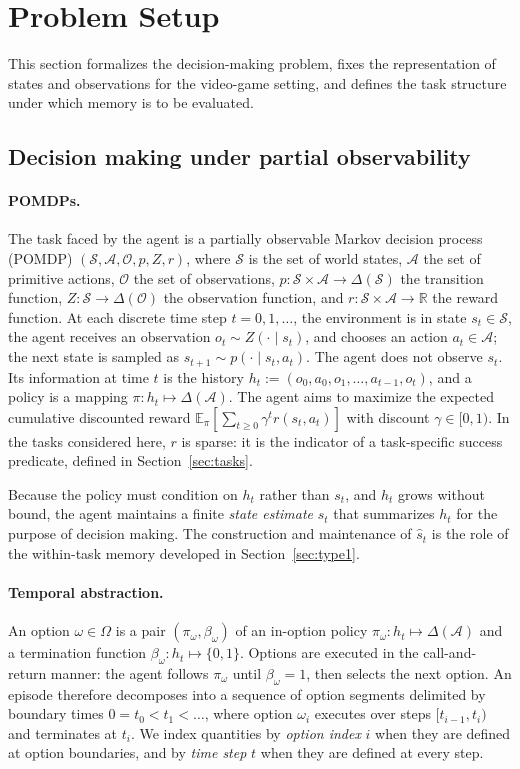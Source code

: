 \documentclass[11pt]{article}
\newcommand{\calS}{\mathcal{S}}
\newcommand{\calA}{\mathcal{A}}
\newcommand{\calO}{\mathcal{O}}
\newcommand{\shat}{\hat{s}}
\begin{document}
\section{Problem Setup}
\label{sec:setup}

This section formalizes the decision-making problem, fixes the representation of states and observations for the video-game setting, and defines the task structure under which memory is to be evaluated.

\subsection{Decision making under partial observability}
\label{sec:pomdp}

\paragraph{POMDPs.}
The task faced by the agent is a partially observable Markov decision process (POMDP) $(\calS, \calA, \calO, p, Z, r)$, where $\calS$ is the set of world states, $\calA$ the set of primitive actions, $\calO$ the set of observations, $p:\calS\times\calA\to\Delta(\calS)$ the transition function, $Z:\calS\to\Delta(\calO)$ the observation function, and $r:\calS\times\calA\to\mathbb{R}$ the reward function. At each discrete time step $t=0,1,\dots$, the environment is in state $s_t\in\calS$, the agent receives an observation $o_t\sim Z(\cdot\mid s_t)$, and chooses an action $a_t\in\calA$; the next state is sampled as $s_{t+1}\sim p(\cdot\mid s_t,a_t)$. The agent does not observe $s_t$. Its information at time $t$ is the history $h_t := (o_0,a_0,o_1,\dots,a_{t-1},o_t)$, and a policy is a mapping $\pi: h_t\mapsto \Delta(\calA)$. The agent aims to maximize the expected cumulative discounted reward $\mathbb{E}_\pi[\sum_{t\ge 0}\gamma^t r(s_t,a_t)]$ with discount $\gamma\in[0,1)$. In the tasks considered here, $r$ is sparse: it is the indicator of a task-specific success predicate, defined in Section~\ref{sec:tasks}.

Because the policy must condition on $h_t$ rather than $s_t$, and $h_t$ grows without bound, the agent maintains a finite \emph{state estimate} $\shat_t$ that summarizes $h_t$ for the purpose of decision making. The construction and maintenance of $\shat_t$ is the role of the within-task memory developed in Section~\ref{sec:type1}.

\paragraph{Temporal abstraction.}
An option $\omega\in\Omega$ is a pair $(\pi_\omega,\beta_\omega)$ of an in-option policy $\pi_\omega:h_t\mapsto\Delta(\calA)$ and a termination function $\beta_\omega:h_t\mapsto\{0,1\}$. Options are executed in the call-and-return manner: the agent follows $\pi_\omega$ until $\beta_\omega=1$, then selects the next option. An episode therefore decomposes into a sequence of option segments delimited by boundary times $0=t_0<t_1<\dots$, where option $\omega_i$ executes over steps $[t_{i-1},t_i)$ and terminates at $t_i$. We index quantities by \emph{option index} $i$ when they are defined at option boundaries, and by \emph{time step} $t$ when they are defined at every step.
\end{document}
